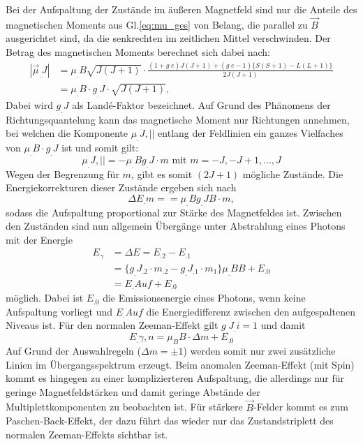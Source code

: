 Bei der Aufspaltung der Zustände im äußeren Magnetfeld sind nur die Anteile des magnetischen Moments aus Gl.\eqref{eq:mu_ges} von Belang, die parallel zu $\vec{B}$ ausgerichtet sind, da die senkrechten im zeitlichen Mittel verschwinden.
Der Betrag des magnetischen Moments berechnet sich dabei nach:
\[
\begin{split}
|\vec{\mu}_.J|&=\mu_.B \sqrt{J(J+1)} \cdot \frac{(1+g_.e) J (J+1) + (g_.e-1)\{S(S+1)-L(L+1)\}}{2 J (J+1)}\\
&= \mu_.B\cdot g_.J \cdot\sqrt{J(J+1)},
\end{split}
\]
Dabei wird $g_.J$ als Landé-Faktor bezeichnet. Auf Grund des Phänomens der Richtungsquantelung kann das magnetische Moment nur Richtungen annehmen, bei welchen die Komponente $\mu_.{J,||}$ entlang der Feldlinien ein ganzes Vielfaches von $\mu_.B \cdot g_.J$ ist und somit gilt:
\[
\mu_.{J, ||}=-\mu_.B g_.J \cdot m \text{ mit } m=-J,-J+1,\hdots, J
\]
Wegen der Begrenzung für $m$, gibt es somit $(2J+1)$ mögliche Zustände.
Die Energiekorrekturen dieser Zustände ergeben sich nach
\[
\Delta E_.m = = \mu_.B g_.J B \cdot m,
\]
sodass die Aufspaltung proportional zur Stärke des Magnetfeldes ist.
Zwischen den Zuständen sind nun allgemein Übergänge unter Abstrahlung eines Photons mit der Energie
\begin{equation*} 
	\begin{split}
	E_\gamma &= \Delta E = E_.2-E_.1 \\
	&=\{g_.{J_.2} \cdot m_.2-g_.{J_.1} \cdot m_1 \} \mu_.B B  + E_.0\\
	&=E_.{Auf}+E_.0
	\end{split}
\end{equation*}
möglich.
Dabei ist $E_.0$ die Emissionsenergie eines Photons, wenn keine Aufspaltung vorliegt und $E_.{Auf}$ die Energiedifferenz zwischen den aufgespaltenen Niveaus ist.
Für den normalen Zeeman-Effekt gilt $g_.{J_.i}=1$ und damit
\begin{equation}
E_.{\gamma,n} = \mu_B B \cdot \Delta m + E_.0
\end{equation}
Auf Grund der Auswahlregeln ($\Delta m = \pm 1$) werden somit nur zwei zusätzliche Linien im Übergangsspektrum erzeugt.
Beim anomalen Zeeman-Effekt (mit Spin) kommt es hingegen zu einer komplizierteren Aufspaltung, die allerdings nur für geringe Magnetfeldstärken und damit geringe Abstände der Multiplettkomponenten zu beobachten ist.
Für stärkere $\vec{B}$-Felder kommt es zum Paschen-Back-Effekt, der dazu führt das wieder nur das Zustandstriplett des normalen Zeeman-Effekts sichtbar ist.



